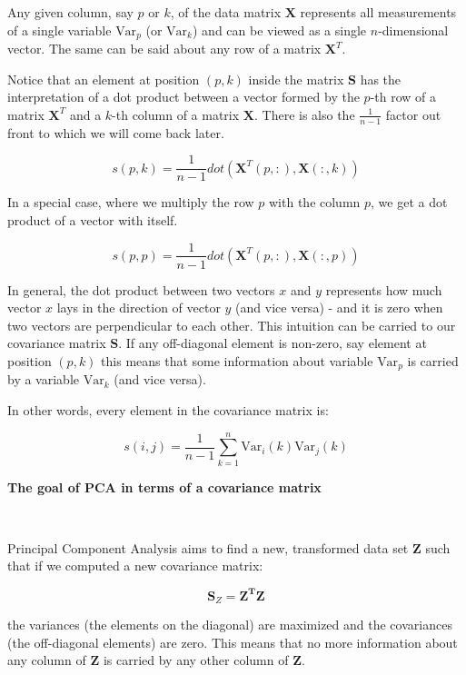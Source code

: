 \documentclass[10pt,twocolumn]{article}
\begin{document}
Any given column, say $p$ or $k$, of the data matrix $\bm{X}$ represents all measurements of a single variable $\text{Var}_p$ (or $\text{Var}_k$) and can be viewed as a single $n$-dimensional vector. The same can be said about any row of a matrix $\bm{X}^T$.

Notice that an element at position $(p,k)$ inside the matrix $\bm{S}$ has the interpretation of a dot product between a vector formed by the $p$-th row of a matrix $\bm{X}^T$ and a $k$-th column of a matrix $\bm{X}$. There is also the $\frac{1}{n-1}$ factor out front to which we will come back later.

\begin{equation}
s(p,k) = \frac{1}{n-1} dot( \bm{X}^T(p, :), \bm{X}(:,k))
\end{equation}

In a special case, where we multiply the row $p$ with the column $p$, we get a dot product of a vector with itself.

\begin{equation}
s(p,p) = \frac{1}{n-1} dot( \bm{X}^T(p, :), \bm{X}(:,p))
\end{equation}

In general, the dot product between two vectors $x$ and $y$ represents how much vector $x$ lays in the direction of vector $y$ (and vice versa) - and it is zero when two vectors are perpendicular to each other. This intuition can be carried to our covariance matrix $\bm{S}$. If any off-diagonal element is non-zero, say element at position $(p,k)$ this means that some information about variable $\text{Var}_p$ is carried by a variable $\text{Var}_k$ (and vice versa).

In other words, every element in the covariance matrix is:

\begin{equation}
s(i,j) = \frac{1}{n-1} \sum\limits_{k=1}^n \text{Var}_i(k) \text{Var}_j(k)
\end{equation}

\textbf{The goal of PCA in terms of a covariance matrix}

\,\,
\,\,

Principal Component Analysis aims to find a new, transformed data set $\bm{Z}$ such that if we computed a new covariance matrix:

\begin{equation}
\bm{S}_Z =  \bm{Z^T} \bm{Z}
\end{equation}

the variances (the elements on the diagonal) are maximized and the covariances (the off-diagonal elements) are zero. This means that no more information about any column of $\bm{Z}$ is carried by any other column of $\bm{Z}$.
\end{document}
